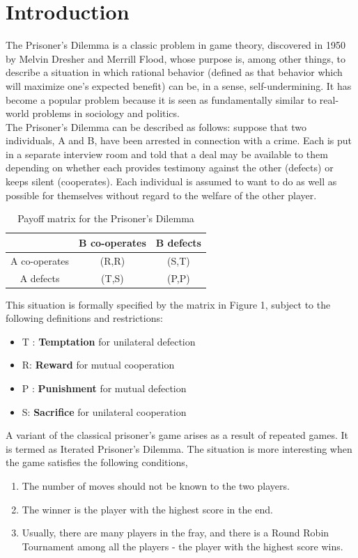 \documentclass[a4paper]{article}
\begin{document}
	\section{Introduction}
	
	The Prisoner's Dilemma is a classic problem in game theory, discovered in 1950 by Melvin Dresher and Merrill Flood, whose purpose is, among other things, to describe a situation in which rational behavior (defined as that behavior which will maximize one's expected benefit) can be, in a sense, self-undermining. It has become a popular problem because it is seen as fundamentally similar to real-world problems in sociology and politics. \\
	The Prisoner's Dilemma can be described as follows: suppose that two individuals, A and B, have been arrested in connection with a crime. Each is put in a separate interview room and told that a deal may be available to them depending on whether each provides testimony against the other (defects) or keeps silent (cooperates). Each individual is assumed to want to do as well as possible for themselves without regard to the welfare of the other player.\\

	\begin{table}[H]
	\centering
	\begin{tabular}{|c|c|c|}
	\hline
						& B co-operates            & B defects 					\\ \hline
	A co-operates  		& (R,R) 		 			& (S,T)         			\\ \hline
	A defects 			& (T,S)           			& (P,P)            			\\ \hline
	\end{tabular}
	\caption{Payoff matrix for the Prisoner's Dilemma}
	\end{table}
		
	This situation is formally specified by the matrix in Figure 1, subject to the following definitions and restrictions:
	\begin{itemize}
		\item T : \textbf{Temptation} for unilateral defection
		\item R: \textbf{Reward} for mutual cooperation
		\item P : \textbf{Punishment} for mutual defection
		\item S: \textbf{Sacrifice} for unilateral cooperation	
	\end{itemize}
	
	A variant of the classical prisoner's game arises as a result of repeated games. It is termed as Iterated Prisoner's Dilemma. The situation is more interesting when the game satisfies the following conditions,
	\begin{enumerate}
	\item The number of moves should not be known to the two players.
	\item The winner is the player with the highest score in the end.
	\item Usually, there are many players in the fray, and there is a Round Robin Tournament among all the players - the player with the highest score wins.		
	\end{enumerate}
	
\end{document}
